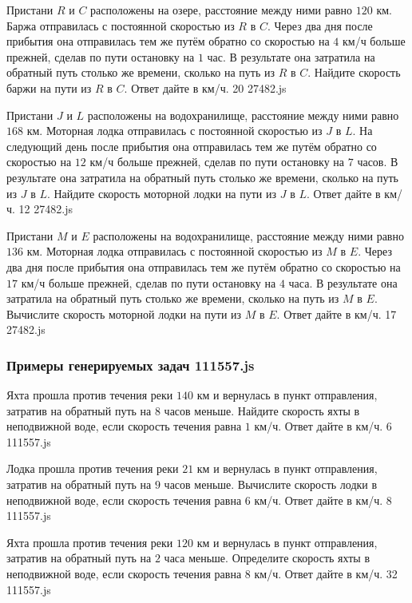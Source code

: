 \par{Пристани $R$ и $C$ расположены на озере, расстояние между ними равно $120$ км. Баржа отправилась с постоянной скоростью из $R$ в $C$. Через два дня после прибытия она отправилась тем же путём обратно со скоростью на $4$ км/ч больше прежней, сделав по пути остановку на $1$ час. В результате она затратила на обратный путь столько же времени, сколько на путь из $R$ в $C$. Найдите скорость баржи на пути из $R$ в $C$. Ответ дайте в км/ч. }{ 20 }{27482.js}
\par{Пристани $J$ и $L$ расположены на водохранилище, расстояние между ними равно $168$ км. Моторная лодка отправилась с постоянной скоростью из $J$ в $L$. На следующий день после прибытия она отправилась тем же путём обратно со скоростью на $12$ км/ч больше прежней, сделав по пути остановку на $7$ часов. В результате она затратила на обратный путь столько же времени, сколько на путь из $J$ в $L$. Найдите скорость моторной лодки на пути из $J$ в $L$. Ответ дайте в км/ч. }{ 12 }{27482.js}
\par{Пристани $M$ и $E$ расположены на водохранилище, расстояние между ними равно $136$ км. Моторная лодка отправилась с постоянной скоростью из $M$ в $E$. Через два дня после прибытия она отправилась тем же путём обратно со скоростью на $17$ км/ч больше прежней, сделав по пути остановку на $4$ часа. В результате она затратила на обратный путь столько же времени, сколько на путь из $M$ в $E$. Вычислите скорость моторной лодки на пути из $M$ в $E$. Ответ дайте в км/ч. }{ 17 }{27482.js}


\subsubsection*{Примеры генерируемых задач 111557.js}

\par{Яхта прошла против течения реки $140$ км и вернулась в пункт отправления, затратив на обратный путь на $8$ часов меньше. Найдите скорость яхты в неподвижной воде, если скорость течения равна $1$ км/ч. Ответ дайте в км/ч. }{ 6 }{111557.js}
\par{Лодка прошла против течения реки $21$ км и вернулась в пункт отправления, затратив на обратный путь на $9$ часов меньше. Вычислите скорость лодки в неподвижной воде, если скорость течения равна $6$ км/ч. Ответ дайте в км/ч. }{ 8 }{111557.js}
\par{Яхта прошла против течения реки $120$ км и вернулась в пункт отправления, затратив на обратный путь на $2$ часа меньше. Определите скорость яхты в неподвижной воде, если скорость течения равна $8$ км/ч. Ответ дайте в км/ч. }{ 32 }{111557.js}

